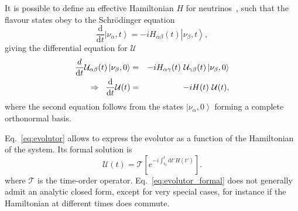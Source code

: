 \documentclass{article}
\newcommand{\de}[0]{\text{d}}
\newcommand{\ket}[1]{\left| #1 \right>}
\begin{document}
It is possible to define an effective Hamiltonian $H$ for neutrinos~\cite{Fantini:2018itu}, such that the flavour states obey to the Schr{\"o}dinger equation
\begin{equation}
	\frac{\de}{\de t} \ket{\nu_\alpha, t}  = - i H_{\alpha \beta}(t) \ket{\nu_\beta, t},
\end{equation}
giving the differential equation for $\mathcal{U}$
\begin{eqnarray}
 \frac{d}{\de t} \mathcal{U}_{\alpha \beta} (t) \ket{\nu_\beta, 0} &=& -i H_{\alpha \gamma}(t)\ \mathcal{U}_{\gamma \beta}(t) \ket{\nu_\beta, 0} \\
	\Rightarrow \hspace{0.2cm} \frac{\de}{\de t} \mathcal{U}(t) &=& - i H(t)\ \mathcal{U}(t), \label{eq:evolutor}
\end{eqnarray}
where the second equation follows from the states $\ket{\nu_\alpha,0}$ forming a complete orthonormal basis.

Eq.~\ref{eq:evolutor} allows to express the evolutor as a function of the Hamiltonian of the system. Its formal solution is
\begin{equation}
	\mathcal{U}(t) = \mathcal{T} \left[ e^{-i \int_{t_0}^t \de t' H(t')} \right].\label{eq:evolutor_formal}
\end{equation}
where $\mathcal{T}$ is the time-order operator. Eq.~\ref{eq:evolutor_formal} does not generally admit an analytic closed form, except for very special cases, for instance if the Hamiltonian at different times does commute.
\end{document}
